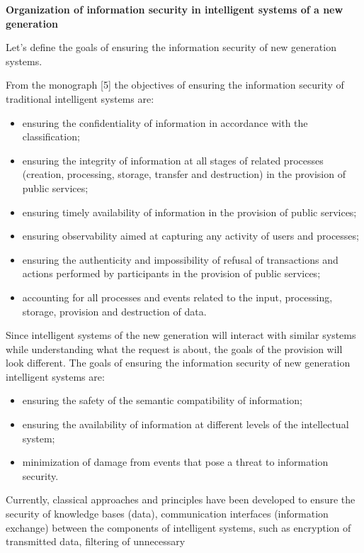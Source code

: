 \documentclass{article}
\begin{document}
\begin{multicols}{2}
\par 
\textbf{Organization of information security in intelligent
systems of a new generation}
\par
Let’s define the goals of ensuring the information security of new generation systems.
\par
From the monograph [5] the objectives of ensuring the information security of traditional intelligent systems are:
\begin{itemize}
    \item ensuring the confidentiality of information in accordance with the classification;
    \item ensuring the integrity of information at all stages of related processes (creation, processing, storage, transfer and destruction) in the provision of public services;
    \item ensuring timely availability of information in the
provision of public services;
    \item ensuring observability aimed at capturing any activity
of users and processes;
    \item ensuring the authenticity and impossibility of refusal of transactions and actions performed by participants in the provision of public services;
     \item accounting for all processes and events related to the input, processing, storage, provision and destruction of data.
\end{itemize}
\par Since intelligent systems of the new generation will interact with similar systems while understanding what the request is about, the goals of the provision will look different. The goals of ensuring the information security of new generation intelligent systems are:
\begin{itemize}
    \item ensuring the safety of the semantic compatibility of information;
    \item ensuring the availability of information at different
levels of the intellectual system;
    \item minimization of damage from events that pose a
threat to information security.
\end{itemize}
\par Currently, classical approaches and principles have
been developed to ensure the security of knowledge bases
(data), communication interfaces (information exchange)
between the components of intelligent systems, such as
encryption of transmitted data, filtering of unnecessary

\end{multicols}
\end{document}
